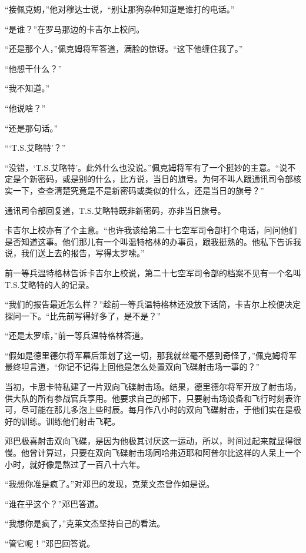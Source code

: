    “接佩克姆，”他对穆达士说，“别让那狗杂种知道是谁打的电话。”

    “是谁？”在罗马那边的卡吉尔上校问。

    “还是那个人，”佩克姆将军答道，满脸的惊讶。“这下他缠住我了。”

    “他想干什么？”

    “我不知道。”

    “他说啥？”

    “还是那句话。”

    “‘T.S.艾略特’？”

    “没错，‘T.S.艾略特’。此外什么也没说。”佩克姆将军有了一个挺妙的主意。“说不定是个新密码，或是别的什么，比方说，当日的旗号。为何不叫人跟通讯司令部核实一下，查查清楚究竟是不是新密码或类似的什么，还是当日的旗号？”

    通讯司令部回复道，T.S.艾略特既非新密码，亦非当日旗号。

    卡吉尔上校亦有了个主意。“也许我该给第二十七空军司令部打个电话，问问他们是否知道这事。他们那儿有一个叫温特格林的办事员，跟我挺熟的。他私下告诉我说，我们送上去的报告，写得太罗嗦。”

    前一等兵温特格林告诉卡吉尔上校说，第二十七空军司令部的档案不见有一个名叫T.S.艾略特的人的记录。

    “我们的报告最近怎么样？”趁前一等兵温特格林还没放下话筒，卡吉尔上校便决定探问一下。“比先前写得好多了，是不是？”

    “还是太罗嗦，”前一等兵温特格林答道。

    “假如是德里德尔将军幕后策划了这一切，那我就丝毫不感到奇怪了，”佩克姆将军最终坦言道，“你记不记得上回他是怎么处置双向飞碟射击场一事的？”

    当初，卡思卡特私建了一片双向飞碟射击场。结果，德里德尔将军开放了射击场，供大队的所有参战官兵享用。他要求自己的部下，只要射击场设备和飞行时刻表许可，尽可能在那儿多泡上些时辰。每月作八小时的双向飞碟射击，于他们实在是极好的训练。训练他们射击飞靶。
 


    邓巴极喜射击双向飞碟，是因为他极其讨厌这一运动，所以，时间过起来就显得很慢。他曾计算过，只要在双向飞碟射击场同哈弗迈耶和阿普尔比这样的人呆上一个小时，就好像是熬过了一百八十六年。

    “我想你准是疯了。”对邓巴的发现，克莱文杰曾作如是说。

    “谁在乎这个？”邓巴答道。

    “我想你是疯了，”克莱文杰坚持自己的看法。

    “管它呢！”邓巴回答说。

